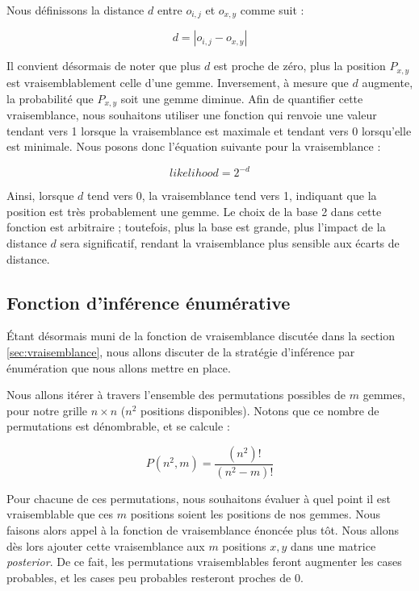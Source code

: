 \documentclass{article}
\begin{document}
\vspace{1em}

\noindent Nous définissons la distance \( d \) entre \( o_{i,j} \) et \( o_{x,y} \) comme suit :

\[
d = \left| o_{i,j} - o_{x,y} \right|
\]

\noindent Il convient désormais de noter que plus \( d \) est proche de zéro, plus la position \( P_{x,y} \) est vraisemblablement celle d'une gemme. Inversement, à mesure que \( d \) augmente, la probabilité que \( P_{x,y} \) soit une gemme diminue. Afin de quantifier cette vraisemblance, nous souhaitons utiliser une fonction qui renvoie une valeur tendant vers 1 lorsque la vraisemblance est maximale et tendant vers 0 lorsqu'elle est minimale. Nous posons donc l'équation suivante pour la vraisemblance :

\[
likelihood = 2^{-d}
\]

\vspace{1em}

\noindent Ainsi, lorsque \( d \) tend vers 0, la vraisemblance tend vers 1, indiquant que la position est très probablement une gemme. Le choix de la base 2 dans cette fonction est arbitraire ; toutefois, plus la base est grande, plus l'impact de la distance \( d \) sera significatif, rendant la vraisemblance plus sensible aux écarts de distance.

\subsection{Fonction d'inférence énumérative}

\noindent Étant désormais muni de la fonction de vraisemblance discutée dans la section \ref{sec:vraisemblance}, nous allons discuter de la stratégie d'inférence par énumération que nous allons mettre en place. 

\vspace{1em}

\noindent Nous allons itérer à travers l'ensemble des permutations possibles de \( m \) gemmes, pour notre grille \( n \times n \) (\( n^2 \) positions disponibles). Notons que ce nombre de permutations est dénombrable, et se calcule :

\[
P(n^2, m) = \frac{(n^2)!}{(n^2 - m)!}
\]

\vspace{1em}

\noindent Pour chacune de ces permutations, nous souhaitons évaluer à quel point il est vraisemblable que ces \( m \) positions soient les positions de nos gemmes. Nous faisons alors appel à la fonction de vraisemblance énoncée plus tôt. Nous allons dès lors ajouter cette vraisemblance aux \( m \) positions \( x, y \) dans une matrice \textit{posterior}. De ce fait, les permutations vraisemblables feront augmenter les cases probables, et les cases peu probables resteront proches de 0.
\end{document}
